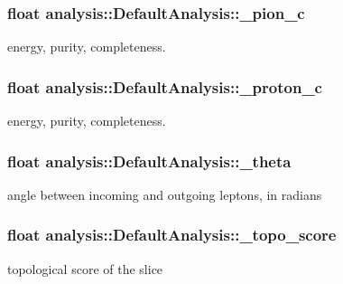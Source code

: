 \subsubsection[{\texorpdfstring{\+\_\+pion\+\_\+c}{_pion_c}}]{\setlength{\rightskip}{0pt plus 5cm}float analysis\+::\+Default\+Analysis\+::\+\_\+pion\+\_\+c\hspace{0.3cm}{\ttfamily [private]}}\hypertarget{classanalysis_1_1DefaultAnalysis_a9978effbcfba62536fc88a73fa985fe9}{}\label{classanalysis_1_1DefaultAnalysis_a9978effbcfba62536fc88a73fa985fe9}
energy, purity, completeness. 
\subsubsection[{\texorpdfstring{\+\_\+proton\+\_\+c}{_proton_c}}]{\setlength{\rightskip}{0pt plus 5cm}float analysis\+::\+Default\+Analysis\+::\+\_\+proton\+\_\+c\hspace{0.3cm}{\ttfamily [private]}}\hypertarget{classanalysis_1_1DefaultAnalysis_a643cc086bdfa4332ced72f6d4e5ce233}{}\label{classanalysis_1_1DefaultAnalysis_a643cc086bdfa4332ced72f6d4e5ce233}
energy, purity, completeness. 
\subsubsection[{\texorpdfstring{\+\_\+theta}{_theta}}]{\setlength{\rightskip}{0pt plus 5cm}float analysis\+::\+Default\+Analysis\+::\+\_\+theta\hspace{0.3cm}{\ttfamily [private]}}\hypertarget{classanalysis_1_1DefaultAnalysis_adb169ccacccada1a17b6699a25f3fd67}{}\label{classanalysis_1_1DefaultAnalysis_adb169ccacccada1a17b6699a25f3fd67}
angle between incoming and outgoing leptons, in radians 
\subsubsection[{\texorpdfstring{\+\_\+topo\+\_\+score}{_topo_score}}]{\setlength{\rightskip}{0pt plus 5cm}float analysis\+::\+Default\+Analysis\+::\+\_\+topo\+\_\+score\hspace{0.3cm}{\ttfamily [private]}}\hypertarget{classanalysis_1_1DefaultAnalysis_a950efb6f4e8f1ad6dd00e24bc74002c2}{}\label{classanalysis_1_1DefaultAnalysis_a950efb6f4e8f1ad6dd00e24bc74002c2}
topological score of the slice 
